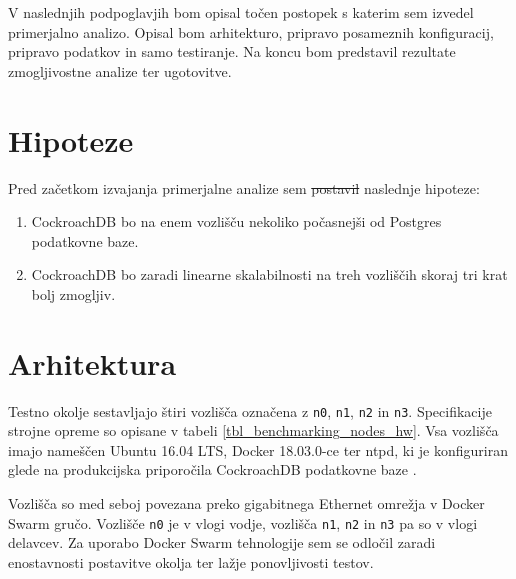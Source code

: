 \documentclass[a4paper, 12pt]{book}
\providecommand{\DIFaddtex}[1]{{\protect\color{blue}\uwave{#1}}} %
\providecommand{\DIFdeltex}[1]{{\protect\color{red}\sout{#1}}}                      %
\providecommand{\DIFaddbegin}{} %
\providecommand{\DIFaddend}{} %
\providecommand{\DIFdelbegin}{} %
\providecommand{\DIFdelend}{} %
\providecommand{\DIFadd}[1]{\texorpdfstring{\DIFaddtex{#1}}{#1}} %
\providecommand{\DIFdel}[1]{\texorpdfstring{\DIFdeltex{#1}}{}} %
\newcommand{\DIFscaledelfig}{0.5}
\newlength{\DIFdelgraphicswidth} %
\newlength{\DIFdelgraphicsheight} %
\newcommand{\DIFaddincludegraphics}[2][]{{\color{blue}\fbox{\DIFOincludegraphics[#1]{#2}}}} %
\newcommand{\DIFdelincludegraphics}[2][]{%
\sbox{\DIFdelgraphicsbox}{\DIFOincludegraphics[#1]{#2}}%
\settoboxwidth{\DIFdelgraphicswidth}{\DIFdelgraphicsbox} %
\settoboxtotalheight{\DIFdelgraphicsheight}{\DIFdelgraphicsbox} %
\scalebox{\DIFscaledelfig}{%
\parbox[b]{\DIFdelgraphicswidth}{\usebox{\DIFdelgraphicsbox}\\[-\baselineskip] \rule{\DIFdelgraphicswidth}{0em}}\llap{\resizebox{\DIFdelgraphicswidth}{\DIFdelgraphicsheight}{%
\setlength{\unitlength}{\DIFdelgraphicswidth}%
\begin{picture}(1,1)%
\thicklines\linethickness{2pt} %
{\color[rgb]{1,0,0}\put(0,0){\framebox(1,1){}}}%
{\color[rgb]{1,0,0}\put(0,0){\line( 1,1){1}}}%
{\color[rgb]{1,0,0}\put(0,1){\line(1,-1){1}}}%
\end{picture}%
}\hspace*{3pt}}} %
} %
\DeclareRobustCommand{\DIFaddbegin}{\DIFOaddbegin \let\includegraphics\DIFaddincludegraphics} %
\DeclareRobustCommand{\DIFaddend}{\DIFOaddend \let\includegraphics\DIFOincludegraphics} %
\DeclareRobustCommand{\DIFdelbegin}{\DIFOdelbegin \let\includegraphics\DIFdelincludegraphics} %
\DeclareRobustCommand{\DIFdelend}{\DIFOaddend \let\includegraphics\DIFOincludegraphics} %
\begin{document}
\DIFaddend V naslednjih podpoglavjih bom opisal točen postopek s katerim sem izvedel primerjalno analizo. Opisal bom arhitekturo, pripravo posameznih konfiguracij, pripravo podatkov in samo testiranje. Na koncu bom predstavil rezultate zmogljivostne analize ter ugotovitve.
\newpage

\section{Hipoteze}
Pred začetkom izvajanja primerjalne analize sem \DIFdelbegin \DIFdel{postavil }\DIFdelend \DIFaddbegin \DIFadd{postavill }\DIFaddend naslednje hipoteze:
\begin{enumerate}
    \item CockroachDB bo na enem vozlišču nekoliko počasnejši od Postgres podatkovne baze.

    \item CockroachDB bo zaradi linearne skalabilnosti na treh vozliščih skoraj tri krat bolj zmogljiv.
\end{enumerate}

\section{Arhitektura}
Testno okolje sestavljajo štiri vozlišča označena z \texttt{n0}, \texttt{n1}, \texttt{n2} in \texttt{n3}. Specifikacije strojne opreme so opisane v tabeli \ref{tbl_benchmarking_nodes_hw}. Vsa vozlišča imajo nameščen Ubuntu 16.04 LTS, Docker 18.03.0-ce ter ntpd, ki je konfiguriran glede na produkcijska priporočila  CockroachDB podatkovne baze \cite{CRDB-ntpd-configuration}.

Vozlišča so med seboj povezana preko gigabitnega Ethernet omrežja v Docker Swarm \cite{Docker-Swarm-Mode} gručo. Vozlišče \texttt{n0} je v vlogi vodje, vozlišča \texttt{n1}, \texttt{n2} in \texttt{n3} pa so v vlogi delavcev. Za uporabo Docker Swarm tehnologije sem se odločil zaradi enostavnosti postavitve okolja ter lažje ponovljivosti testov.
\end{document}
